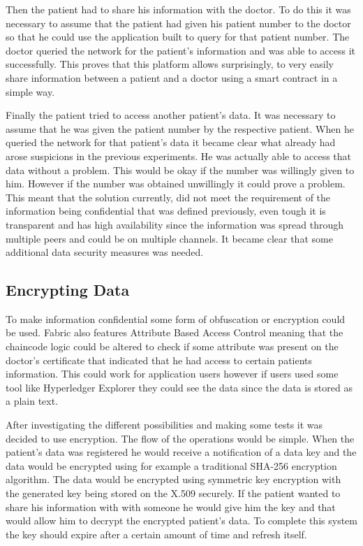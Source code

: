 Then the patient had to share his information with the doctor. To do this it
was necessary to assume that the patient had given his patient number to the
doctor so that he could use the application built to query for that patient
number. The doctor queried the network for the patient's information and was
able to access it successfully. This proves that this platform allows
surprisingly, to very easily share information between a patient and a doctor
using a smart contract in a simple way.

Finally the patient tried to access another patient's data. It was necessary to
assume that he was given the patient number by the respective patient. When he
queried the network for that patient's data it became clear what already had
arose suspicions in the previous experiments. He was actually able to access
that data without a problem. This would be okay if the number was willingly
given to him. However if the number was obtained unwillingly it could prove a
problem. This meant that the solution currently, did not meet the requirement
of the information being confidential that was defined previously, even tough
it is transparent and has high availability since the information was spread
through multiple peers and could be on multiple channels. It became clear that
some additional data security measures was needed.

\subsection{Encrypting Data}

To make information confidential some form of obfuscation or encryption could
be used. Fabric also features Attribute Based Access Control meaning that the
chaincode logic could be altered to check if some attribute was present on the
doctor's certificate that indicated that he had access to certain patients
information. This could work for application users however if users used some
tool like Hyperledger Explorer they could see the data since the data is stored
as a plain text.

After investigating the different possibilities and making some tests it was
decided to use encryption. The flow of the operations would be simple. When the
patient's data was registered he would receive a notification of a data key and
the data would be encrypted using for example a traditional SHA-256 encryption
algorithm. The data would be encrypted using symmetric key encryption with the
generated key being stored on the X.509 securely.  If the patient wanted to
share his information with with someone he would give him the key and that
would allow him to decrypt the encrypted patient's data.  To complete this
system the key should expire after a certain amount of time and refresh itself.

